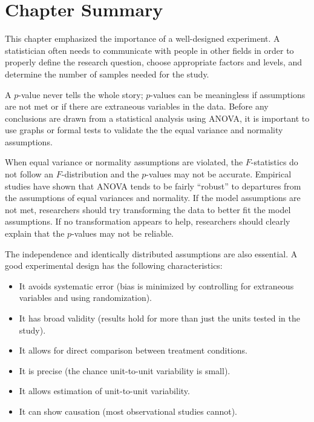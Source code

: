 \documentclass[
]{report}
\begin{document}
\section*{\texorpdfstring{\textbf{Chapter Summary}}{Chapter Summary}}\label{chapter-summary-3}

This chapter emphasized the importance of a well-designed experiment. A statistician often needs to communicate with people in other fields in order to properly define the research question, choose appropriate factors and levels, and determine the number of samples needed for the study.

A \(p\)-value never tells the whole story; \(p\)-values can be meaningless if assumptions are not met or if there are extraneous variables in the data. Before any conclusions are drawn from a statistical analysis using ANOVA, it is important to use graphs or formal tests to validate the the equal variance and normality assumptions.

When equal variance or normality assumptions are violated, the \(F\)-statistics do not follow an \(F\)-distribution and the \(p\)-values may not be accurate. Empirical studies have shown that ANOVA tends to be fairly ``robust'' to departures from the assumptions of equal variances and normality. If the model assumptions are not met, researchers should try transforming the data to better fit the model assumptions. If no transformation appears to help, researchers should clearly explain that the \(p\)-values may not be reliable.

The independence and identically distributed assumptions are also essential. A good experimental design has the following characteristics:

\begin{itemize}
    \item It avoids systematic error (bias is minimized by controlling for extraneous variables and using randomization).
    \item It has broad validity (results hold for more than just the units tested in the study).
    \item It allows for direct comparison between treatment conditions.
    \item It is precise (the chance unit-to-unit variability is small).
    \item It allows estimation of unit-to-unit variability.
    \item It can show causation (most observational studies cannot).
\end{itemize}
\end{document}
